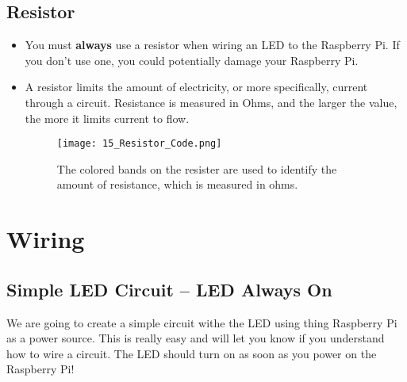 \documentclass{article}\usepackage[]{graphicx}\usepackage[]{color}
\begin{document}
\subsection{Resistor}

\begin{itemize}
\item You must \textbf{always} use a resistor when wiring an LED to the Raspberry Pi. If you don't use one, you could potentially damage your Raspberry Pi.
\item A resistor limits the amount of electricity, or more specifically, current through a circuit. Resistance is measured in Ohms, and the larger the value, the more it limits current to flow.

\begin{figure}[h]
\centering
\texttt{[image: 15\_Resistor\_Code.png]}
\caption{The colored bands on the resister are used to identify the amount of resistance, which is measured in ohms.\label{fig:ledres}}
\end{figure}

\end{itemize}

\section{Wiring}

\subsection{Simple LED Circuit -- LED Always On}

We are going to create a simple circuit withe the LED using thing Raspberry Pi as a power source. This is really easy and will let you know if you understand how to wire a circuit. The LED should turn on as soon as you power on the Raspberry Pi!
\end{document}
